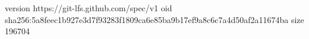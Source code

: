 version https://git-lfs.github.com/spec/v1
oid sha256:5a8feec1b927e3d7f93283f1809ca6e85ba9b17ef9a8c6c7a4d50af2a11674ba
size 196704
